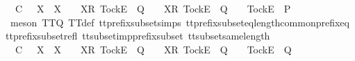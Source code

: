 \begin{isabellebody}
\ {\isachardoublequoteopen}{\isasymrho}{\isacharprime}\ {\isasymsubseteq}\isactrlsub C\ {\isasymrho}{\isacharprime}{\isacharprime}\ {\isasymLongrightarrow}\ X\ {\isasymsubseteq}\ X{\isacharprime}\ {\isasymLongrightarrow}\ {\isasymrho}{\isacharprime}{\isacharprime}\ {\isacharat}\ {\isacharbrackleft}{\isacharbrackleft}X{\isacharprime}{\isacharbrackright}\isactrlsub R{\isacharcomma}\ {\isacharbrackleft}Tock{\isacharbrackright}\isactrlsub E{\isacharbrackright}\ {\isasymin}\ Q\ {\isasymLongrightarrow}\ {\isasymrho}{\isacharprime}\ {\isacharat}\ {\isacharbrackleft}{\isacharbrackleft}X{\isacharbrackright}\isactrlsub R{\isacharcomma}\ {\isacharbrackleft}Tock{\isacharbrackright}\isactrlsub E{\isacharbrackright}\ {\isasymnotin}\ Q\ {\isasymLongrightarrow}\ {\isasymrho}{\isacharprime}\ {\isacharat}\ {\isacharbrackleft}{\isacharbrackleft}Tock{\isacharbrackright}\isactrlsub E{\isacharbrackright}\ {\isasymin}\ P{\isachardoublequoteclose}\isanewline
\ \ \ \ \ \ \isamarkupfalse%
\ {\isacharparenleft}meson\ TT{}{\isacharunderscore}Q\ TT{}{\isacharunderscore}def\ tt{\isacharunderscore}prefix{\isacharunderscore}subset{\isachardot}simps{\isacharparenleft}{}{\isacharparenright}\ tt{\isacharunderscore}prefix{\isacharunderscore}subset{\isacharunderscore}eq{\isacharunderscore}length{\isacharunderscore}common{\isacharunderscore}prefix{\isacharunderscore}eq\ tt{\isacharunderscore}prefix{\isacharunderscore}subset{\isacharunderscore}refl\ tt{\isacharunderscore}subset{\isacharunderscore}imp{\isacharunderscore}prefix{\isacharunderscore}subset\ tt{\isacharunderscore}subset{\isacharunderscore}same{\isacharunderscore}length{\isacharparenright}\isanewline
\ \ \isamarkupfalse%
\isanewline
\ \ \ \ \isamarkupfalse%
\ {\isachardoublequoteopen}{\isasymrho}{\isacharprime}\ {\isasymsubseteq}\isactrlsub C\ {\isasymrho}{\isacharprime}{\isacharprime}\ {\isasymLongrightarrow}\ X\ {\isasymsubseteq}\ X{\isacharprime}\ {\isasymLongrightarrow}\ {\isasymrho}{\isacharprime}{\isacharprime}\ {\isacharat}\ {\isacharbrackleft}{\isacharbrackleft}X{\isacharprime}{\isacharbrackright}\isactrlsub R{\isacharcomma}\ {\isacharbrackleft}Tock{\isacharbrackright}\isactrlsub E{\isacharbrackright}\ {\isasymin}\ Q\ {\isasymLongrightarrow}\ {\isasymrho}{\isacharprime}\ {\isacharat}\ {\isacharbrackleft}{\isacharbrackleft}X{\isacharbrackright}\isactrlsub R{\isacharcomma}\ {\isacharbrackleft}Tock{\isacharbrackright}\isactrlsub E{\isacharbrackright}\ {\isasymnotin}\ Q\ {\isasymLongrightarrow}\ {\isasymrho}{\isacharprime}\ {\isacharat}\ {\isacharbrackleft}{\isacharbrackleft}Tock{\isacharbrackright}\isactrlsub E{\isacharbrackright}\ {\isasymin}\ Q{\isachardoublequoteclose}\isanewline

\end{isabellebody}
